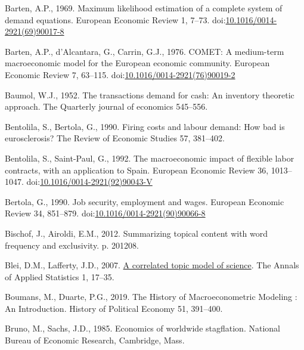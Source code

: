 \documentclass[
  12pt,
  onecolumn]{article}
\newlength{\cslhangindent}
\newlength{\cslentryspacingunit} %
\newenvironment{CSLReferences}[2] %
 {%
  \setlength{\parindent}{0pt}
  \ifodd #1
  \let\oldpar\par
  \def\par{\hangindent=\cslhangindent\oldpar}
  \fi
  \setlength{\parskip}{#2\cslentryspacingunit}
 }%
 {}
\begin{document}
\begin{CSLReferences}{1}{0}
\leavevmode{}%
Barten, A.P., 1969. Maximum likelihood estimation of a complete system
of demand equations. European Economic Review 1, 7--73.
doi:\href{https://doi.org/10.1016/0014-2921(69)90017-8}{10.1016/0014-2921(69)90017-8}

\leavevmode{}%
Barten, A.P., d'Alcantara, G., Carrin, G.J., 1976. {COMET}: {A}
medium-term macroeconomic model for the {European} economic community.
European Economic Review 7, 63--115.
doi:\href{https://doi.org/10.1016/0014-2921(76)90019-2}{10.1016/0014-2921(76)90019-2}

\leavevmode{}%
Baumol, W.J., 1952. The transactions demand for cash: {An} inventory
theoretic approach. The Quarterly journal of economics 545--556.

\leavevmode{}%
Bentolila, S., Bertola, G., 1990. Firing costs and labour demand: How
bad is eurosclerosis? The Review of Economic Studies 57, 381--402.

\leavevmode{}%
Bentolila, S., Saint-Paul, G., 1992. The macroeconomic impact of
flexible labor contracts, with an application to {Spain}. European
Economic Review 36, 1013--1047.
doi:\href{https://doi.org/10.1016/0014-2921(92)90043-V}{10.1016/0014-2921(92)90043-V}

\leavevmode{}%
Bertola, G., 1990. Job security, employment and wages. European Economic
Review 34, 851--879.
doi:\href{https://doi.org/10.1016/0014-2921(90)90066-8}{10.1016/0014-2921(90)90066-8}

\leavevmode{}%
Bischof, J., Airoldi, E.M., 2012. Summarizing topical content with word
frequency and exclusivity. p. 201208.

\leavevmode{}%
Blei, D.M., Lafferty, J.D., 2007.
\href{https://www.jstor.org/stable/4537420}{A correlated topic model of
science}. The Annals of Applied Statistics 1, 17--35.

\leavevmode{}%
Boumans, M., Duarte, P.G., 2019. The {History} of {Macroeconometric
Modeling} : {An Introduction}. History of Political Economy 51,
391--400.

\leavevmode{}%
Bruno, M., Sachs, J.D., 1985. Economics of worldwide stagflation.
{National Bureau of Economic Research}, {Cambridge, Mass.}


\end{CSLReferences}
\end{document}
